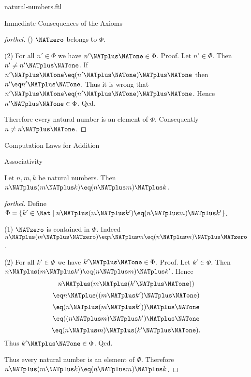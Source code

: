 \documentclass{naproche-library}
\begin{document}
\begin{smodule}[title=Natural Numbers]{natural-numbers.ftl}
\begin{sfragment}{Immediate Consequences of the Axioms}
\begin{proof}[forthel]
    (\NATone) $\NATzero$ belongs to $\Phi$.

    (2) For all $n' \in \Phi$ we have $n' \NATplus \NATone \in \Phi$. \newline
    Proof.
      Let $n' \in \Phi$.
      Then $n' \neq n' \NATplus \NATone$.
      If $n' \NATplus \NATone \eq (n' \NATplus \NATone) \NATplus \NATone$ then $n' \eq n' \NATplus \NATone$.
      Thus it is wrong that $n' \NATplus \NATone \eq (n' \NATplus \NATone) \NATplus \NATone$.
      Hence $n' \NATplus \NATone \in \Phi$.
    Qed.

    Therefore every natural number is an element of $\Phi$.
    Consequently $n \neq n \NATplus \NATone$.
  \end{proof}
\end{sfragment}

\begin{sfragment}{Computation Laws for Addition}
  \begin{sfragment}{Associativity}
    \begin{proposition}[forthel,id=ARITHMETIC_03_3235893452210176]
      Let $n, m, k$ be natural numbers.
      Then $n \NATplus (m \NATplus k) \eq (n \NATplus m) \NATplus k$.
    \end{proposition}
    \begin{proof}[forthel]
      Define $\Phi = \{ k' \in \Nat \mid n \NATplus (m \NATplus k') \eq (n \NATplus m) \NATplus k' \}$.

      (1) $\NATzero$ is contained in $\Phi$.
      Indeed $n \NATplus (m \NATplus \NATzero) \eq n \NATplus m \eq (n \NATplus m) \NATplus \NATzero$.

      (2) For all $k' \in \Phi$ we have $k' \NATplus \NATone \in \Phi$. \newline
      Proof.
        Let $k' \in \Phi$.
        Then $n \NATplus (m \NATplus k') \eq (n \NATplus m) \NATplus k'$.
        Hence
        \[  n \NATplus (m \NATplus (k' \NATplus \NATone))        \]
        \[    \eq n \NATplus ((m \NATplus k') \NATplus \NATone)    \]
        \[    \eq (n \NATplus (m \NATplus k')) \NATplus \NATone    \]
        \[    \eq ((n \NATplus m) \NATplus k') \NATplus \NATone    \]
        \[    \eq (n \NATplus m) \NATplus (k' \NATplus \NATone).   \]
        Thus $k' \NATplus \NATone \in \Phi$.
      Qed.

      Thus every natural number is an element of $\Phi$.
      Therefore $n \NATplus (m \NATplus k) \eq (n \NATplus m) \NATplus k$.
    \end{proof}
  \end{sfragment}


\end{sfragment}
\end{smodule}
\end{document}
